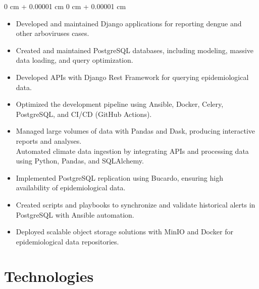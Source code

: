 \documentclass[10pt, letterpaper]{article}
\newenvironment{highlights}{
    \begin{itemize}[
        topsep=0.10 cm,
        parsep=0.10 cm,
        partopsep=0pt,
        itemsep=0pt,
        leftmargin=0 cm + 10pt
    ]
}{
    \end{itemize}
} %
\newenvironment{onecolentry}{
    \begin{adjustwidth}{
        0 cm + 0.00001 cm
    }{
        0 cm + 0.00001 cm
    }
}{
    \end{adjustwidth}
} %
\begin{document}
        \vspace{0.10 cm}
        \begin{onecolentry}
            \begin{highlights}
                \item Developed and maintained Django applications for reporting dengue and other arboviruses cases. \\
                \item Created and maintained PostgreSQL databases, including modeling, massive data loading, and query optimization. \\
                \item Developed APIs with Django Rest Framework for querying epidemiological data. \\
                \item Optimized the development pipeline using Ansible, Docker, Celery, PostgreSQL, and CI/CD (GitHub Actions). \\
                \item Managed large volumes of data with Pandas and Dask, producing interactive reports and analyses. \\
                \itemmarker Automated climate data ingestion by integrating APIs and processing data using Python, Pandas, and SQLAlchemy. \\
                \item Implemented PostgreSQL replication using Bucardo, ensuring high availability of epidemiological data. \\
                \item Created scripts and playbooks to synchronize and validate historical alerts in PostgreSQL with Ansible automation. \\
                \item Deployed scalable object storage solutions with MinIO and Docker for epidemiological data repositories. \\
            \end{highlights}
        \end{onecolentry}
    \section{Technologies}
        
\end{document}
